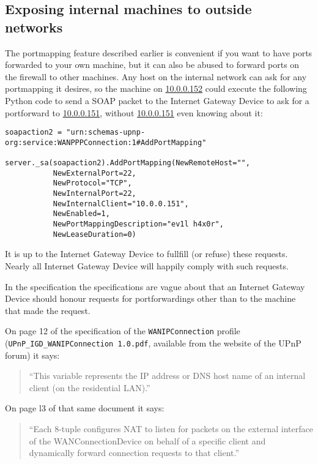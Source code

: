 \documentclass[10pt]{article}
\begin{document}
\subsection{Exposing internal machines to outside networks}

The portmapping feature described earlier is convenient if you want to have
ports forwarded to your own machine, but it can also be abused to forward
ports on the firewall to other machines. Any host on the internal network can
ask for any portmapping it desires, so the machine on \url{10.0.0.152} could
execute the following Python code to send a SOAP packet to the Internet
Gateway Device to ask for a portforward to \url{10.0.0.151}, without
\url{10.0.0.151} even knowing about it:

\begin{verbatim}
soapaction2 = "urn:schemas-upnp-org:service:WANPPPConnection:1#AddPortMapping"

server._sa(soapaction2).AddPortMapping(NewRemoteHost="",
           NewExternalPort=22,
           NewProtocol="TCP",
           NewInternalPort=22,
           NewInternalClient="10.0.0.151",
           NewEnabled=1,
           NewPortMappingDescription="ev1l h4x0r",
           NewLeaseDuration=0)
\end{verbatim}

\begin{center}
\end{center}

It is up to the Internet Gateway Device to fullfill (or refuse) these
requests. Nearly all Internet Gateway Device will happily comply with such
requests.

In the specification the specifications are vague about that an Internet
Gateway Device should honour requests for portforwardings other than to the
machine that made the request.

On page 12 of the specification of the \texttt{WANIPConnection} profile
(\texttt{UPnP\_IGD\_WANIPConnection 1.0.pdf}, available from the website of
the UPnP forum\cite{upnpforum}) it says:

\begin{quote}
``This variable represents the IP address or DNS host name of an internal
client (on the residential LAN).''
\end{quote}

On page l3 of that same document it says:

\begin{quote}
``Each 8-tuple configures NAT to listen for packets on the external interface
of the WANConnectionDevice on behalf of a specific client and dynamically
forward connection requests to that client.''
\end{quote}
\end{document}
